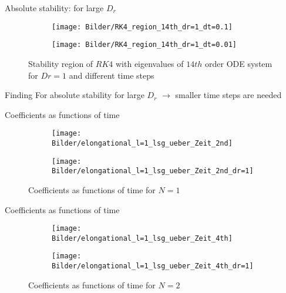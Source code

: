 \begin{frame}{Absolute stability: for large $D_r$}
	\begin{figure}
		\begin{subfigure}{0.48\textwidth}
			\texttt{[image: Bilder/RK4\_region\_14th\_dr=1\_dt=0.1]}
		\end{subfigure}
		\hfill
		\begin{subfigure}{0.48\textwidth}
			\texttt{[image: Bilder/RK4\_region\_14th\_dr=1\_dt=0.01]}
		\end{subfigure}
		\caption{Stability region of $RK4$ with eigenvalues of $14th$ order ODE system for $Dr=1$ and different time steps}
	\end{figure}

	\begin{block}{Finding}
	For absolute stability for large $D_r$  $\rightarrow$ smaller time steps are needed
	\end{block}
\end{frame}


\begin{frame}{Coefficients as functions of time}
	\begin{figure}
		\begin{subfigure}{0.48\textwidth}
			\texttt{[image: Bilder/elongational\_l=1\_lsg\_ueber\_Zeit\_2nd]}
		\end{subfigure}
		\hfill
		\begin{subfigure}{0.48\textwidth}
			\texttt{[image: Bilder/elongational\_l=1\_lsg\_ueber\_Zeit\_2nd\_dr=1]}
		\end{subfigure}
		\caption{Coefficients as functions of time for $N=1$}
	\end{figure}
\end{frame}


\begin{frame}{Coefficients as functions of time}
	\begin{figure}
		\begin{subfigure}{0.48\textwidth}
			\texttt{[image: Bilder/elongational\_l=1\_lsg\_ueber\_Zeit\_4th]}
		\end{subfigure}
		\hfill
		\begin{subfigure}{0.48\textwidth}
			\texttt{[image: Bilder/elongational\_l=1\_lsg\_ueber\_Zeit\_4th\_dr=1]}
		\end{subfigure}
		\caption{Coefficients as functions of time for $N=2$}
	\end{figure}
\end{frame}

